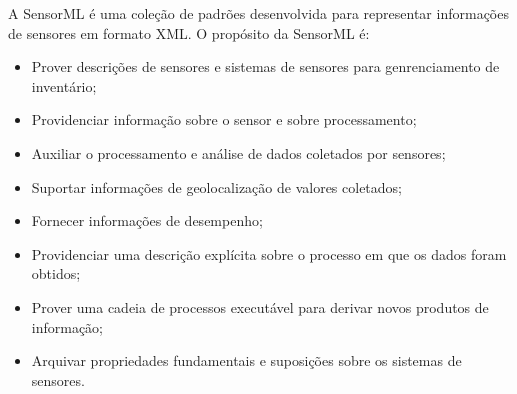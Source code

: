      A \acrfull{SensorML} \cite{SML} é uma coleção de padrões
    desenvolvida para representar informações de sensores em formato XML. O propósito da \acrshort{SensorML} é:
    \begin{itemize}
      \item Prover descrições de sensores e sistemas de sensores para genrenciamento de inventário;
      \item Providenciar informação sobre o sensor e sobre processamento;
      \item Auxiliar o processamento e análise de dados coletados por sensores;
      \item Suportar informações de geolocalização de valores coletados;
      \item Fornecer informações de desempenho;
      \item Providenciar uma descrição explícita sobre o processo em que os dados foram obtidos;
      \item Prover uma cadeia de processos executável para derivar novos produtos de informação;
      \item Arquivar propriedades fundamentais e suposições sobre os sistemas de sensores.
    \end{itemize}
